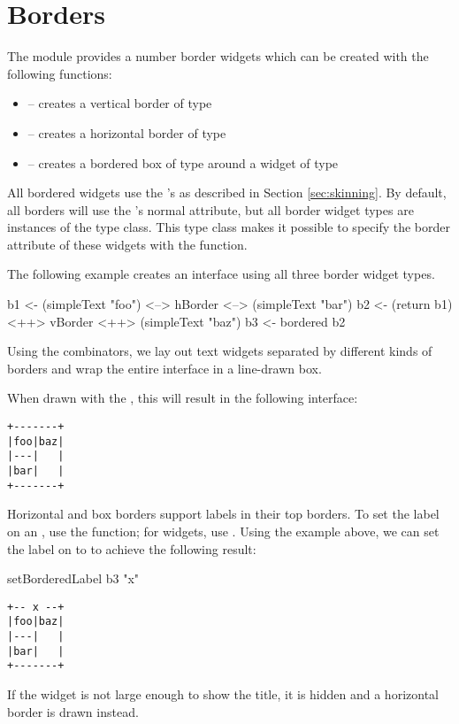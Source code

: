 \section{Borders}

The  module provides a number border widgets which can be
created with the following functions:

\begin{itemize}
\item {} -- creates a vertical border of type 
\item {} -- creates a horizontal border of type 
\item {} -- creates a bordered box of type  around a widget of type 
\end{itemize}

All bordered widgets use the 's  as
described in Section \ref{sec:skinning}.  By default, all borders will
use the 's normal attribute, but all border widget
types are instances of the  type class.  This type
class makes it possible to specify the border attribute of these
widgets with the  function.

The following example creates an interface using all three border
widget types.

\begin{haskellcode}
 b1 <- (simpleText "foo") <--> hBorder <--> (simpleText "bar")
 b2 <- (return b1) <++> vBorder <++> (simpleText "baz")
 b3 <- bordered b2
\end{haskellcode}

Using the  combinators, we lay out text widgets separated by
different kinds of borders and wrap the entire interface in a
line-drawn box.

When drawn with the , this will result in the following
interface:

\begin{verbatim}
+-------+
|foo|baz|
|---|   |
|bar|   |
+-------+
\end{verbatim}

Horizontal and box borders support labels in their top borders.  To
set the label on an , use the 
function; for  widgets, use .  Using
the example above, we can set the label on  to  to
achieve the following result:

\begin{haskellcode}
setBorderedLabel b3 "x"
\end{haskellcode}

\begin{verbatim}
+-- x --+
|foo|baz|
|---|   |
|bar|   |
+-------+
\end{verbatim}

If the  widget is not large enough to show the title, it
is hidden and a horizontal border is drawn instead.
